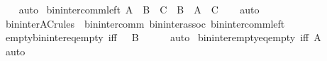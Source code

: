 \begin{isabellebody}
%
\isadelimproof
\ \ %
\endisadelimproof
%
\isatagproof
{}\isamarkupfalse%
\ auto%
\endisatagproof
{\isafoldproof}%
%
\isadelimproof
\isanewline
%
\endisadelimproof
\isanewline
{}\isamarkupfalse%
\ bin{\isacharunderscore}{\kern0pt}inter{\isacharunderscore}{\kern0pt}comm{\isacharunderscore}{\kern0pt}left{\isacharcolon}{\kern0pt}\ {\isachardoublequoteopen}A\ {\isasyminter}\ {\isacharparenleft}{\kern0pt}B\ {\isasyminter}\ C{\isacharparenright}{\kern0pt}\ {\isacharequal}{\kern0pt}\ B\ {\isasyminter}\ {\isacharparenleft}{\kern0pt}A\ {\isasyminter}\ C{\isacharparenright}{\kern0pt}{\isachardoublequoteclose}\isanewline
%
\isadelimproof
\ \ %
\endisadelimproof
%
\isatagproof
{}\isamarkupfalse%
\ auto%
\endisatagproof
{\isafoldproof}%
%
\isadelimproof
\isanewline
%
\endisadelimproof
\isanewline
{}\isamarkupfalse%
\ bin{\isacharunderscore}{\kern0pt}inter{\isacharunderscore}{\kern0pt}AC{\isacharunderscore}{\kern0pt}rules\ {\isacharequal}{\kern0pt}\ bin{\isacharunderscore}{\kern0pt}inter{\isacharunderscore}{\kern0pt}comm\ bin{\isacharunderscore}{\kern0pt}inter{\isacharunderscore}{\kern0pt}assoc\ bin{\isacharunderscore}{\kern0pt}inter{\isacharunderscore}{\kern0pt}comm{\isacharunderscore}{\kern0pt}left\isanewline
\isanewline
{}\isamarkupfalse%
\ empty{\isacharunderscore}{\kern0pt}bin{\isacharunderscore}{\kern0pt}inter{\isacharunderscore}{\kern0pt}eq{\isacharunderscore}{\kern0pt}empty\ {\isacharbrackleft}{\kern0pt}iff{\isacharbrackright}{\kern0pt}{\isacharcolon}{\kern0pt}\ {\isachardoublequoteopen}{\isacharbraceleft}{\kern0pt}{\isacharbraceright}{\kern0pt}\ {\isasyminter}\ B\ {\isacharequal}{\kern0pt}\ {\isacharbraceleft}{\kern0pt}{\isacharbraceright}{\kern0pt}{\isachardoublequoteclose}\isanewline
%
\isadelimproof
\ \ %
\endisadelimproof
%
\isatagproof
{}\isamarkupfalse%
\ auto%
\endisatagproof
{\isafoldproof}%
%
\isadelimproof
\isanewline
%
\endisadelimproof
\isanewline
{}\isamarkupfalse%
\ bin{\isacharunderscore}{\kern0pt}inter{\isacharunderscore}{\kern0pt}empty{\isacharunderscore}{\kern0pt}eq{\isacharunderscore}{\kern0pt}empty\ {\isacharbrackleft}{\kern0pt}iff{\isacharbrackright}{\kern0pt}{\isacharcolon}{\kern0pt}\ {\isachardoublequoteopen}A\ {\isasyminter}\ {\isacharbraceleft}{\kern0pt}{\isacharbraceright}{\kern0pt}\ {\isacharequal}{\kern0pt}\ {\isacharbraceleft}{\kern0pt}{\isacharbraceright}{\kern0pt}{\isachardoublequoteclose}\isanewline
%
\isadelimproof
\ \ %
\endisadelimproof
%
\isatagproof
{}\isamarkupfalse%
\ auto%
\endisatagproof
{\isafoldproof}%

\end{isabellebody}
